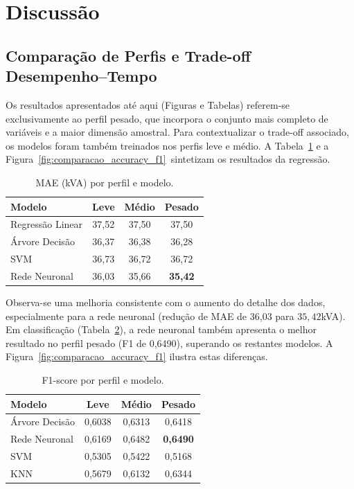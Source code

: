 \documentclass[conference]{IEEEtran}
\begin{document}
\section{Discussão}

\subsection{Comparação de Perfis e Trade-off Desempenho–Tempo}

Os resultados apresentados até aqui (Figuras e Tabelas) referem-se exclusivamente ao perfil pesado, que incorpora o conjunto mais completo de variáveis e a maior dimensão amostral. Para contextualizar o trade-off associado, os modelos foram também treinados nos perfis leve e médio. A Tabela~\ref{tab:perfis_reg} e a Figura~\ref{fig:comparacao_accuracy_f1} \,sintetizam os resultados da regressão.

\begin{table}[H]
\caption{MAE (kVA) por perfil e modelo.}
\label{tab:perfis_reg}
\centering
\begin{tabular}{lccc}
\toprule
Modelo & Leve & Médio & Pesado \\
\midrule
Regressão Linear & 37,52 & 37,50 & 37,50 \\
Árvore Decisão   & 36,37 & 36,38 & 36,28 \\
SVM              & 36,73 & 36,72 & 36,72 \\
Rede Neuronal    & 36,03 & 35,66 & \textbf{35,42} \\
\bottomrule
\end{tabular}
\end{table}

Observa-se uma melhoria consistente com o aumento do detalhe dos dados, especialmente para a rede neuronal (redução de MAE de 36,03 para $35{,}42$kVA). Em classificação (Tabela~\ref{tab:perfis_clf}), a rede neuronal também apresenta o melhor resultado no perfil pesado (F1 de 0,6490), superando os restantes modelos. A Figura~\ref{fig:comparacao_accuracy_f1} ilustra estas diferenças.

\begin{table}[H]
\caption{F1-score por perfil e modelo.}
\label{tab:perfis_clf}
\centering
\begin{tabular}{lccc}
\toprule
Modelo & Leve & Médio & Pesado \\
\midrule
Árvore Decisão & 0,6038 & 0,6313 & 0,6418 \\
Rede Neuronal & 0,6169 & 0,6482 & \textbf{0,6490} \\
SVM           & 0,5305 & 0,5422 & 0,5168 \\
KNN           & 0,5679 & 0,6132 & 0,6344 \\
\bottomrule
\end{tabular}
\end{table}
\end{document}
